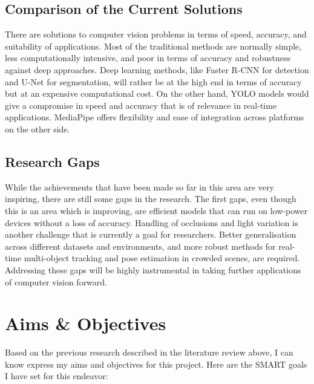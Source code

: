     \subsection{Comparison of the Current Solutions}
        There are solutions to computer vision problems in terms of speed, accuracy, and suitability of applications. Most of the traditional methods are normally simple, less computationally intensive, and poor in terms of accuracy and robustness against deep approaches. Deep learning methods, like Faster R-CNN for detection and U-Net for segmentation, will rather be at the high end in terms of accuracy but at an expensive computational cost. On the other hand, YOLO models would give a compromise in speed and accuracy that is of relevance in real-time applications. MediaPipe offers flexibility and ease of integration across platforms on the other side.
    \subsection{Research Gaps}    
        While the achievements that have been made so far in this area are very inspiring, there are still some gaps in the research. The first gaps, even though this is an area which is improving, are efficient models that can run on low-power devices without a loss of accuracy. Handling of occlusions and light variation is another challenge that is currently a goal for researchers. Better generalisation across different datasets and environments, and more robust methods for real-time multi-object tracking and pose estimation in crowded scenes, are required. Addressing these gaps will be highly instrumental in taking further applications of computer vision forward.

\section{Aims \& Objectives}

    Based on the previous research described in the literature review above, I can know express my aims and objectives for this project. Here are the SMART goals I have set for this endeavor:

